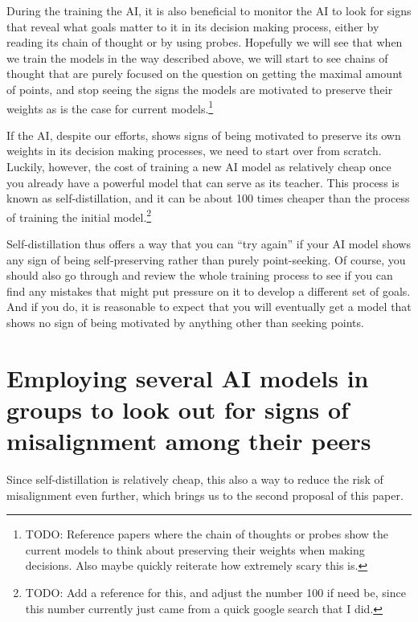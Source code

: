 \documentclass{article}
\begin{document}
During the training the AI, it is also beneficial to monitor the AI to look for signs that reveal what goals matter to it in its decision making process, either by reading its chain of thought or by using probes. Hopefully we will see that when we train the models in the way described above, we will start to see chains of thought that are purely focused on the question on getting the maximal amount of points, and stop seeing the signs the models are motivated to preserve their weights as is the case for current models.\footnote{TODO: Reference papers where the chain of thoughts or probes show the current models to think about preserving their weights when making decisions. Also maybe quickly reiterate how extremely scary this is.}


If the AI, despite our efforts, shows signs of being motivated to preserve its own weights in its decision making processes, we need to start over from scratch. Luckily, however, the cost of training a new AI model as relatively cheap once you already have a powerful model that can serve as its teacher. This process is known as self-distillation, and it can be about 100 times cheaper than the process of training the initial model.\footnote{TODO: Add a reference for this, and adjust the number 100 if need be, since this number currently just came from a quick google search that I did.}

Self-distillation thus offers a way that you can ``try again'' if your AI model shows any sign of being self-preserving rather than purely point-seeking. Of course, you should also go through and review the whole training process to see if you can find any mistakes that might put pressure on it to develop a different set of goals. And if you do, it is reasonable to expect that you will eventually get a model that shows no sign of being motivated by anything other than seeking points.





\section{Employing several AI models in groups to look out for signs of misalignment among their peers}

Since self-distillation is relatively cheap, this also a way to reduce the risk of misalignment even further, which brings us to the second proposal of this paper.
\end{document}
